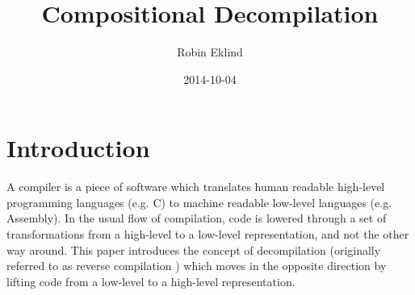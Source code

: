 \documentclass[12pt, a4paper]{article}
\title{Compositional Decompilation} %
\author{Robin Eklind}
\date{2014-10-04}
\begin{document}
\maketitle

\pagebreak

\tableofcontents

\pagebreak


\section{Introduction}

A compiler is a piece of software which translates human readable high-level
programming languages (e.g. C) to machine readable low-level languages (e.g.
Assembly). In the usual flow of compilation, code is lowered through a set of
transformations from a high-level to a low-level representation, and not the
other way around. This paper introduces the concept of decompilation (originally
referred to as reverse compilation \cite{rev_comp}) which moves in the opposite
direction by lifting code from a low-level to a high-level representation.

\pagebreak


\end{document}
